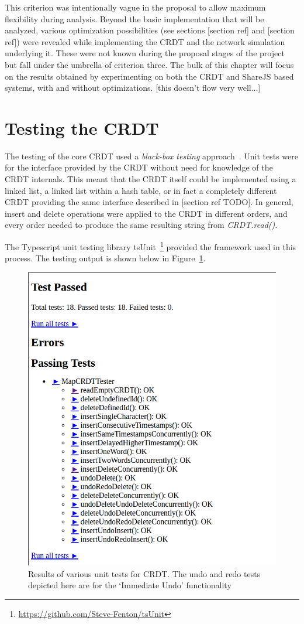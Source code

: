 \documentclass[12pt,a4paper,twoside,openright]{report}
\begin{document}
	This criterion was intentionally vague in the proposal to allow maximum flexibility during analysis. Beyond the basic implementation that will be analyzed, various optimization possibilities (see sections [section ref] and [section ref]) were revealed while implementing the CRDT and the network simulation underlying it. These were not known during the proposal stages of the project but fall under the umbrella of criterion three. The bulk of this chapter will focus on the results obtained by experimenting on both the CRDT and ShareJS based systems, with and without optimizations.
	[this doesn't flow very well...]
	
	
	
	\section{Testing the CRDT}
	
	The testing of the core CRDT used a \textit{black-box testing} approach~\cite{Patton}. Unit tests were for the interface provided by the CRDT without need for knowledge of the CRDT internals. This meant that the CRDT itself could be implemented using a linked list, a linked list within a hash table, or in fact a completely different CRDT providing the same interface described in [section ref TODO]. In general, insert and delete operations were applied to the CRDT in different orders, and every order needed to produce the same resulting string from \textit{CRDT.read()}.
	
	The Typescript unit testing library tsUnit~\footnote{\url{https://github.com/Steve-Fenton/tsUnit}} provided the framework used in this process. The testing output is shown below in Figure~\ref{fig:unittests}.

	\begin{figure}[htb]
	\centering
	\includegraphics[width=0.7\linewidth]{figs/unittests.png}
	\caption[Unit tests for CRDT]{Results of various unit tests for CRDT. The undo and redo tests depicted here are for the `Immediate Undo' functionality}
	\label{fig:unittests}
	\end{figure}
	
\end{document}
